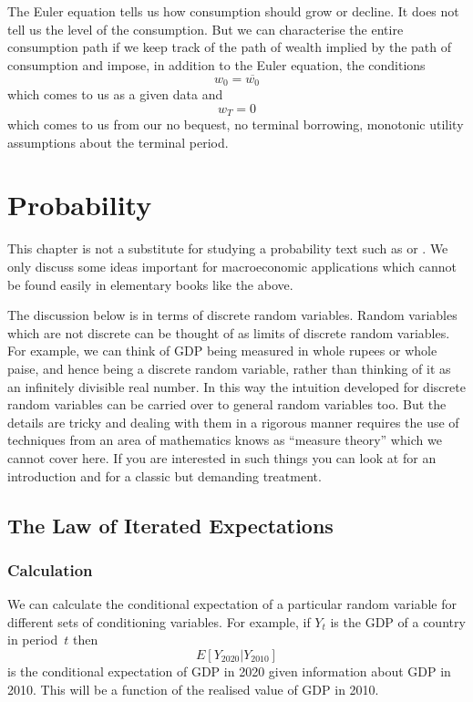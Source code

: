 \documentclass[12pt,reqno,openany]{amsbook}
\theoremstyle{plain}
\theoremstyle{definition}
\begin{document}
The Euler equation tells us how consumption should grow or decline. It
does not tell us the level of the consumption. But we can characterise
the entire consumption path if we keep track of
the path of wealth implied by the path of consumption and impose, in
addition to the Euler equation, the
conditions
\[w_0 = \overline{w_0}\]
which comes to us as a given data and 
\[w_T=0\]
which comes to us from our no bequest, no terminal borrowing,
monotonic utility assumptions about the terminal period.

\chapter{Probability}
This chapter is not a substitute for studying a probability text such
as \cite{chung-elementary} or \cite{ross-probability}. We only discuss
some ideas important for macroeconomic applications which cannot be
found easily in elementary books like the above. 

The discussion below is in terms of discrete random variables. Random
variables which are not discrete can be thought of as limits of
discrete random variables. For example, we can think of GDP being
measured in whole rupees or whole paise, and hence being a discrete
random variable, rather than thinking of it as an infinitely divisible
real number. In this way the intuition developed for discrete random
variables can be carried over to general random variables too. But the
details are tricky and dealing with them in a rigorous manner requires
the use of techniques from an area of mathematics knows as ``measure
theory'' which we cannot cover here. If you are interested in such
things you can look at \cite{jacod-protter-essentials} for an
introduction and \cite{billingsley-prob-measure} for a classic but
demanding treatment.

\section{The Law of Iterated Expectations}
\subsection{Calculation}
We can calculate the conditional expectation of a particular random
variable for different sets of conditioning variables. For example, if
$Y_t$ is the GDP of a country in period~$t$ then
\[E[Y_{2020}|Y_{2010}]\]
is the conditional expectation of GDP in 2020 given information about
GDP in 2010. This will be a function of the realised value of GDP in
2010. 
\end{document}
